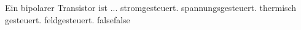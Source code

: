     {Ein bipolarer Transistor ist ...}
    {stromgesteuert.}
    {spannungsgesteuert.}
    {thermisch gesteuert.}
    {feldgesteuert.}
    {false}{false}